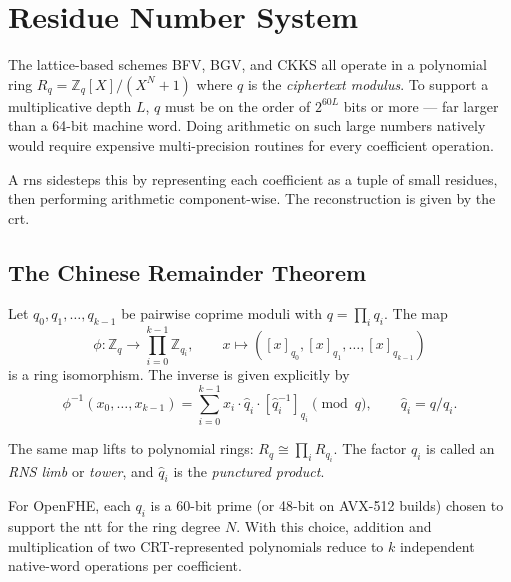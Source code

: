 
\ifclaude
\section{Residue Number System}
\label{sec:rns}

The lattice-based schemes BFV, BGV, and CKKS all operate in a polynomial ring $R_q = \mathbb{Z}_q[X]/(X^N + 1)$ where $q$ is the \emph{ciphertext modulus}. To support a multiplicative depth $L$, $q$ must be on the order of $2^{60L}$ bits or more --- far larger than a 64-bit machine word. Doing arithmetic on such large numbers natively would require expensive multi-precision routines for every coefficient operation.

A \gls{rns} sidesteps this by representing each coefficient as a tuple of small residues, then performing arithmetic component-wise. The reconstruction is given by the \gls{crt}.

\subsection{The Chinese Remainder Theorem}
\label{sec:rns:crt}

\begin{theorem}[CRT]
\label{thm:crt}
Let $q_0, q_1, \dots, q_{k-1}$ be pairwise coprime moduli with $q = \prod_i q_i$. The map
\begin{equation}
    \label{eq:crt-iso}
    \phi : \mathbb{Z}_q \to \prod_{i=0}^{k-1} \mathbb{Z}_{q_i}, \qquad x \mapsto ([x]_{q_0}, [x]_{q_1}, \dots, [x]_{q_{k-1}})
\end{equation}
is a ring isomorphism. The inverse is given explicitly by
\begin{equation}
    \label{eq:crt-recon}
    \phi^{-1}(x_0, \dots, x_{k-1}) = \sum_{i=0}^{k-1} x_i \cdot \hat{q}_i \cdot [\hat{q}_i^{-1}]_{q_i} \pmod{q}, \qquad \hat{q}_i = q/q_i.
\end{equation}
\end{theorem}

The same map lifts to polynomial rings: $R_q \cong \prod_i R_{q_i}$. The factor $q_i$ is called an \emph{RNS limb} or \emph{tower}, and $\hat{q}_i$ is the \emph{punctured product}.

For OpenFHE, each $q_i$ is a 60-bit prime (or 48-bit on AVX-512 builds) chosen to support the \gls{ntt} for the ring degree $N$. With this choice, addition and multiplication of two CRT-represented polynomials reduce to $k$ independent native-word operations per coefficient.

